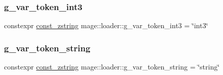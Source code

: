 \hypertarget{namespacemage_1_1loader_a6d17673197d2bb9487c8c874a741da8f}{}\label{namespacemage_1_1loader_a6d17673197d2bb9487c8c874a741da8f} 
\subsubsection{\texorpdfstring{g\+\_\+var\+\_\+token\+\_\+int3}{g\_var\_token\_int3}}
{\footnotesize\ttfamily constexpr \hyperlink{namespacemage_abfd9206dc607ceb5d13ec68bf075a5c0}{const\+\_\+zstring} mage\+::loader\+::g\+\_\+var\+\_\+token\+\_\+int3 = \char`\"{}int3\char`\"{}}

\hypertarget{namespacemage_1_1loader_a653c16a1fffe8a8f00cc11923d6243a8}{}\label{namespacemage_1_1loader_a653c16a1fffe8a8f00cc11923d6243a8} 
\subsubsection{\texorpdfstring{g\+\_\+var\+\_\+token\+\_\+string}{g\_var\_token\_string}}
{\footnotesize\ttfamily constexpr \hyperlink{namespacemage_abfd9206dc607ceb5d13ec68bf075a5c0}{const\+\_\+zstring} mage\+::loader\+::g\+\_\+var\+\_\+token\+\_\+string = \char`\"{}string\char`\"{}}

